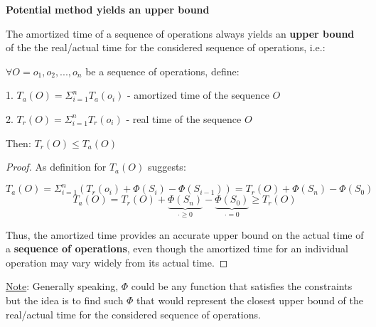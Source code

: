 \begin{theorem}
    \textbf{Potential method yields an upper bound}

    The amortized time of a sequence of operations always yields an \textbf{upper bound} of the the real/actual time for the considered sequence of operations, i.e.:

    $\forall O = o_1, o_2, ..., o_n$ be a sequence of operations, define:

    1. $T_{a}(O) = \Sigma_{i=1}^{n} T_{a}(o_i)$ - amortized time of the sequence $O$

    2. $T_{r}(O) = \Sigma_{i=1}^{n} T_r(o_i)$ - real time of the sequence $O$

    Then: $T_r(O) \leq T_a(O)$

\end{theorem}

\begin{proof}

    As definition for $T_a(O)$ suggests:

    $$ T_{a}(O) = \Sigma_{i=1}^{n} (T_{r}(o_i) + \Phi(S_i) - \Phi(S_{i-1})) = T_{r}(O) + \Phi(S_n) - \Phi(S_0) $$
    $$ T_{a}(O) = T_{r}(O) + \underbrace{\Phi(S_n)}_{\cdot \geq 0} - \underbrace{\Phi(S_0)}_{\cdot = 0} \geq T_{r}(O) $$

    Thus, the amortized time provides an accurate upper bound on the actual time of a \textbf{sequence of operations}, even though the amortized time for an individual operation may vary widely from its actual time.

\end{proof}

\underline{Note}: Generally speaking, $\Phi$ could be any function that satisfies the constraints but the idea is to find such $\Phi$ that would represent the closest upper bound of the real/actual time for the considered sequence of operations.

